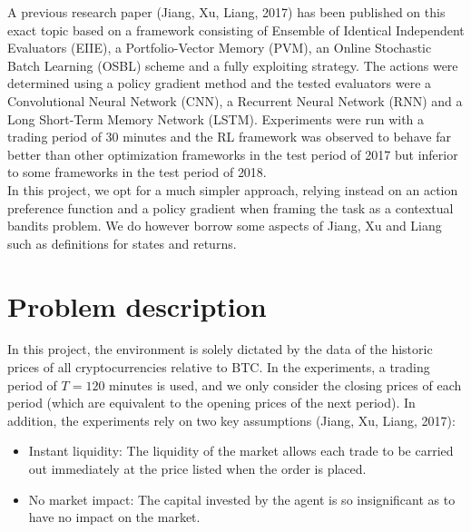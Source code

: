 \documentclass[a4paper,12pt]{article}
\begin{document}
A previous research paper (Jiang, Xu, Liang, 2017) has been published on this exact topic based on a framework consisting of Ensemble of Identical Independent Evaluators (EIIE), a Portfolio-Vector Memory (PVM), an Online Stochastic Batch Learning (OSBL) scheme and a fully exploiting strategy. The actions were determined using a policy gradient method and the tested evaluators were a Convolutional Neural Network (CNN), a Recurrent Neural Network (RNN) and a Long Short-Term Memory Network (LSTM). Experiments were run with a trading period of 30 minutes and the RL framework was observed to behave far better than other optimization frameworks in the test period of 2017 but inferior to some frameworks in the test period of 2018. \\

In this project, we opt for a much simpler approach, relying instead on an action preference function and a policy gradient when framing the task as a contextual bandits problem. We do however borrow some aspects of Jiang, Xu and Liang such as definitions for states and returns. \\

\section{Problem description}
In this project, the environment is solely dictated by the data of the historic prices of all cryptocurrencies relative to BTC. In the experiments, a trading period of $T = 120$ minutes is used, and we only consider the closing prices of each period (which are equivalent to the opening prices of the next period). In addition, the experiments rely on two key assumptions (Jiang, Xu, Liang, 2017):

\begin{itemize}
  \item Instant liquidity: The liquidity of the market allows each trade to be carried out immediately at the price listed when the order is placed.
  \item No market impact: The capital invested by the agent is so insignificant as to have no impact on the market.
\end{itemize}
\end{document}
